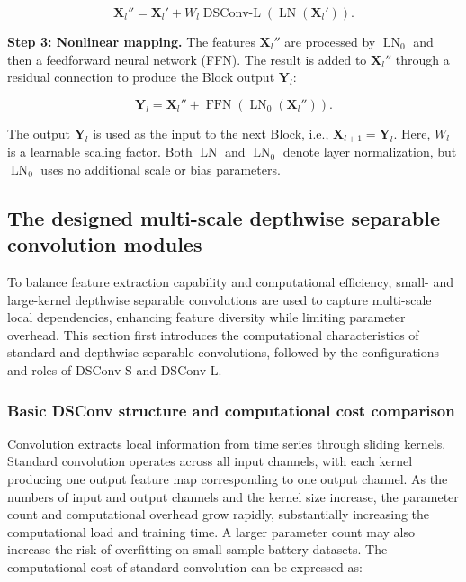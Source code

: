 \begin{equation}
\mathbf X_l''
=
\mathbf X_l'
+
W_l
\operatorname{DSConv\text{-}L}
\left(
\operatorname{LN}(\mathbf X_l')
\right).
\label{eq:block_dsconv_l}
\end{equation}

\textbf{Step 3: Nonlinear mapping.} The features $\mathbf X_l''$ are processed by $\operatorname{LN}_0$ and then a feedforward neural network (FFN). The result is added to $\mathbf X_l''$ through a residual connection to produce the Block output $\mathbf Y_l$:

\begin{equation}
\mathbf Y_l
=
\mathbf X_l''+
\operatorname{FFN}
\left(
\operatorname{LN}_0(\mathbf X_l'')
\right).
\label{eq:block_ffn}
\end{equation}

The output $\mathbf Y_l$ is used as the input to the next Block, i.e., $\mathbf X_{l+1}=\mathbf Y_l$. Here, $W_l$ is a learnable scaling factor. Both $\operatorname{LN}$ and $\operatorname{LN}_0$ denote layer normalization, but $\operatorname{LN}_0$ uses no additional scale or bias parameters.


\FloatBarrier

\subsection{The designed multi-scale depthwise separable convolution modules}

To balance feature extraction capability and computational efficiency, small- and large-kernel depthwise separable convolutions are used to capture multi-scale local dependencies, enhancing feature diversity while limiting parameter overhead. This section first introduces the computational characteristics of standard and depthwise separable convolutions, followed by the configurations and roles of DSConv-S and DSConv-L.


\subsubsection{Basic DSConv structure and computational cost comparison}

Convolution extracts local information from time series through sliding kernels. Standard convolution operates across all input channels, with each kernel producing one output feature map corresponding to one output channel. As the numbers of input and output channels and the kernel size increase, the parameter count and computational overhead grow rapidly, substantially increasing the computational load and training time. A larger parameter count may also increase the risk of overfitting on small-sample battery datasets. The computational cost of standard convolution can be expressed as:

